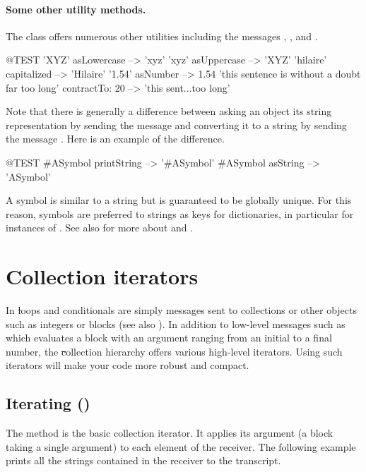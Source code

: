 \documentclass[a4paper,10pt,twoside]{book}
\begin{document}
\paragraph{Some other utility methods.}
The class  offers numerous other utilities including the messages , , and . 

\begin{code}{@TEST}
'XYZ' asLowercase --> 'xyz'
'xyz' asUppercase   --> 'XYZ'
'hilaire' capitalized   --> 'Hilaire'
'1.54' asNumber      --> 1.54
'this sentence is without a doubt far too long' contractTo: 20 --> 'this sent...too long'
\end{code}

Note that there is generally a difference between asking an object its string representation by sending the message  and converting it to a string by sending the message .
Here is an example of the difference.

\begin{code}{@TEST}
#ASymbol printString --> '#ASymbol'
#ASymbol asString    --> 'ASymbol'
\end{code}

A symbol is similar to a string but is guaranteed to be globally unique.
For this reason, symbols are preferred to strings as keys for dictionaries, in particular for instances of .
See also  for more about  and .

\section{Collection iterators}
\label{sec:iterators}

In \st loops and conditionals are simply messages sent to collections or other objects such as integers or blocks (see also ).
In addition to low-level messages such as  which evaluates a block with an argument ranging from an initial to a final number, the \st collection hierarchy offers various high-level iterators.
Using such iterators will make your code more robust and compact. 

\subsection{Iterating ()}
The method  is the basic collection iterator.
It applies its argument (a block taking a single argument) to each element of the receiver.
The following example prints all the strings contained in the receiver to the transcript.
\end{document}
